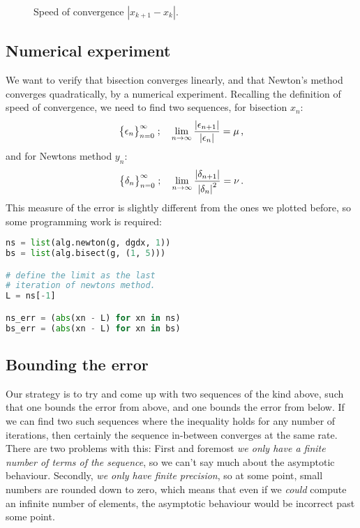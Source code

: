 \documentclass[12pt]{article}
\begin{document}
\begin{multicols}{2}
\begin{figure}[H]
\centering

\caption{
    Speed of convergence $|x_{k+1} - x_k|$.
}
\end{figure}

\subsection*{Numerical experiment}
We want to verify that bisection converges linearly,
and that Newton's method converges quadratically, by
a numerical experiment.
Recalling the definition of speed of convergence,
we need to find two sequences, for bisection $x_n$:
\[
    \big\{ \epsilon _n \big\}_{n = 0}^\infty \;\text;\quad
        \lim_{n \rightarrow \infty}
            \frac
                {\left| \epsilon_{n + 1} \right|}
                {\left| \epsilon_n \right|}
        = \mu \,\text,
\]
and for Newtons method $y_n$:
\[
    \big\{ \delta_n \big\}_{n = 0}^\infty \;\text;\quad
        \lim_{n \rightarrow \infty}
            \frac
                {\left| \delta_{n + 1} \right|}
                {\left| \delta_n \right|^2}
        = \nu \,\text.
\]
This measure of the error is slightly different from the
ones we plotted before, so some programming work is required:
\begin{lstlisting}[language=Python, caption={Generators for the errors}]
ns = list(alg.newton(g, dgdx, 1))
bs = list(alg.bisect(g, (1, 5)))

# define the limit as the last
# iteration of newtons method.
L = ns[-1]

ns_err = (abs(xn - L) for xn in ns)
bs_err = (abs(xn - L) for xn in bs)
\end{lstlisting}

\subsection*{Bounding the error}
Our strategy is to try and come up with two sequences of
the kind above, such that one bounds
the error from above, and one bounds the error from below.
If we can find two such sequences where the inequality holds
for any number of iterations, then certainly the
sequence in-between converges at the same rate.
There are two problems with this: First and foremost
{\em we only have a finite number of terms of the sequence},
so we can't say much about the asymptotic behaviour.
Secondly, {\em we only have finite precision},
so at some point, small numbers are rounded down to zero,
which means that even if we {\em could} compute
an infinite number of elements, the asymptotic behaviour would
be incorrect past some point.


\end{multicols}
\end{document}
